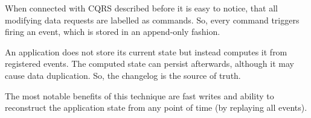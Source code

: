 When connected with CQRS described before it is easy to notice, that all modifying data requests are labelled as commands. So, every command triggers firing an event, which is stored in an append-only fashion. 

An application does not store its current state but instead computes it from registered events. The computed state can persist afterwards, although it may cause data duplication. So, the changelog is the source of truth.

The most notable benefits of this technique are fast writes and ability to reconstruct the application state from any point of time (by replaying all events). 


